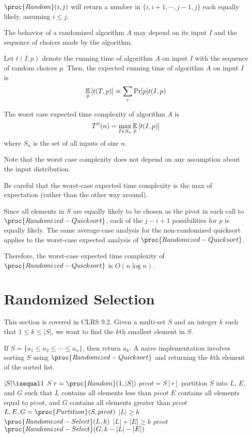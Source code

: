 $\proc{Random}(i,j)$ will return a number in $\{i, i+1, \cdots, j-1, j\}$ each equally likely, assuming $i \leq j$.

The behavior of a randomized algorithm $A$ may depend on its input $I$ and the sequence of choices made by the algorithm.

Let $t(I,p)$ denote the running time of algorithm $A$ on input $I$ with the sequence of random choices $p$. Then, the expected running time of algorithm $A$ on input $I$ is
$$
\operatorname*{\mathbb{E}}_p \left[ t(T,p) \right] = \sum_e \Pr [p] t(I,p)
$$

The worst case expected time complexity of algorithm $A$ is
$$
T''(n) = \max_{I \in S_n} \operatorname*{\mathbb{E}}_p \left[ t(I,p) \right]
$$
where $S_n$ is the set of all inputs of size $n$.

Note that the worst case complexity does not depend on any assumption about the input distribution.

\begin{remark}
    Be careful that the worst-case expected time complexity is the max of expectation (rather than the other way around).
\end{remark}

Since all elements in $S$ are equally likely to be chosen as the pivot in each call to $\proc{Randomized-Quicksort}$, each of the $j-i+1$ possibilities for $p$ is equally likely. The same average-case analysis for the non-randomized quicksort applies to the worst-case expected analysis of $\proc{Randomized-Quicksort}$.

Therefore, the worst-case expected time complexity of $\proc{Randomized-Quicksort}$ is $O(n \log n)$.

\section{Randomized Selection}

This section is covered in CLRS 9.2. Given a multi-set $S$ and an integer $k$ such that $1 \leq k \leq |S|$, we want to find the $k$th smallest element in $S$.

If $S = \{a_1 \leq a_2 \leq \cdots \leq a_n \}$, then return $a_k$. A naive implementation involves sorting $S$ using $\proc{Randomized-Quicksort}$ and returning the $k$th element of the sorted list.

\begin{codebox}
    \li \If $|S| \isequal 1$
    \li \Then \Return $S$ \End
    \li $r = \proc{Random}(1,|S|)$
    \li $pivot = S[r]$ 
    \zi \Comment partition $S$ into $L$, $E$, and $G$ such that $L$ contains all elements less than $pivot$
    \zi \Comment $E$ contains all elements equal to $pivot$, and $G$ contains all elements greater than $pivot$
    \li $L,E,G = \proc{Partition}(S,pivot)$
    \li \If $|L| \geq k$ \Then
    \li \Return $\proc{Randomized-Select}(L,k)$
    \End
    \li \If $|L| + |E| \geq k$ \Then
    \li \Return $pivot$
    \End
    \li \Return $\proc{Randomized-Select}(G, k-|L|-|E|)$
\end{codebox}


